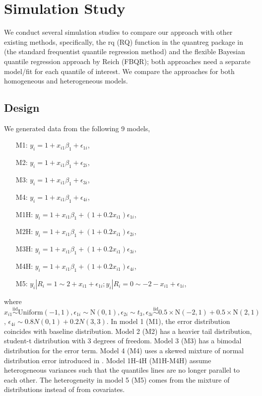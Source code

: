 \documentclass[12pt]{article}
\begin{document}
\section{Simulation Study}
\label{ch2:sec:simulations}
We conduct several simulation studies to compare our approach with
other existing methods, specifically, the rq (RQ) function in the
quantreg package \citep{quantreg} in \cite{R} (the standard
frequentist quantile regression method) and the flexible Bayesian
quantile regression approach by Reich (FBQR);
both approaches need a separate model/fit for each quantile of interest.
We compare the
approaches for both homogeneous and heterogeneous models.

\subsection{Design}
We generated data from the following 9 models,
\begin{itemize}
\item [M1:] $y_i = 1 + x_{i1}\beta_1 + \epsilon_{1i}$,
\item [M2:] $y_i = 1 + x_{i1}\beta_1 + \epsilon_{2i}$,
\item [M3:] $y_i = 1 + x_{i1}\beta_1 + \epsilon_{3i}$,
\item [M4:] $y_i = 1 + x_{i1}\beta_1 + \epsilon_{4i}$,
\item [M1H:] $y_i = 1 + x_{i1}\beta_1 + (1 + 0.2x_{i1})
  \epsilon_{1i}$,
\item [M2H:] $y_i = 1 + x_{i1}\beta_1 + (1 + 0.2x_{i1})
  \epsilon_{2i}$,
\item [M3H:] $y_i = 1 + x_{i1}\beta_1 + (1 + 0.2x_{i1})
  \epsilon_{3i}$,
\item [M4H:] $y_i = 1 + x_{i1}\beta_1 + (1 + 0.2x_{i1})
  \epsilon_{4i}$,
\item [M5:] $y_{i} | R_i = 1 \sim 2 + x_{i1} + \epsilon_{1i}; y_{i}|
  R_i = 0 \sim -2 - x_{i1} + \epsilon_{1i}$,
\end{itemize}
where $x_{i1} \stackrel{\mbox{iid}}{\sim} \mathrm{Uniform}(-1,1), \epsilon_{1i} \sim \mathrm{N}(0,1), \epsilon_{2i} \sim t_3, \epsilon_{3i} \stackrel{\mbox{iid}}{\sim} 0.5 \times \mathrm{N}(-2,1) + 0.5 \times \mathrm{N}(2,1)$, $\epsilon_{4i} \sim 0.8 N(0,1) + 0.2 N(3,3)$.
In model 1 (M1), the error distribution coincides with baseline distribution.
Model 2 (M2) has a heavier tail distribution, student-t distribution with 3 degrees of freedom.
Model 3 (M3) has a bimodal distribution for the error term.
Model 4 (M4) uses a skewed mixture of normal distribution error introduced in \citet{reich2010}.
Model 1H-4H (M1H-M4H) assume heterogeneous variances such that the quantiles lines are no longer parallel to each other.
The heterogeneity in model 5 (M5) comes from the mixture of distributions instead of from covariates.
\end{document}
